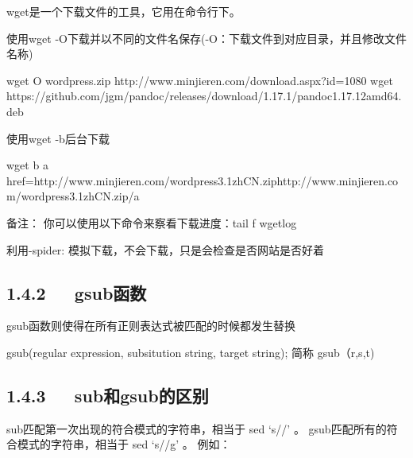\documentclass[letterpaper,12pt,english]{sphinxmanual}
\begin{document}
wget是一个下载文件的工具，它用在命令行下。

使用wget -O下载并以不同的文件名保存(-O：下载文件到对应目录，并且修改文件名称)

\begin{sphinxVerbatim}[commandchars=\\\{\}]
wget \PYGZhy{}O wordpress.zip http://www.minjieren.com/download.aspx?id=1080
wget https://github.com/jgm/pandoc/releases/download/1.17.1/pandoc\PYGZhy{}1.17.1\PYGZhy{}2\PYGZhy{}amd64.deb
\end{sphinxVerbatim}

使用wget -b后台下载

\begin{sphinxVerbatim}[commandchars=\\\{\}]
wget \PYGZhy{}b \PYGZlt{}a href=\PYGZdq{}http://www.minjieren.com/wordpress\PYGZhy{}3.1\PYGZhy{}zh\PYGZus{}CN.zip\PYGZdq{}\PYGZgt{}http://www.minjieren.com/wordpress\PYGZhy{}3.1\PYGZhy{}zh\PYGZus{}CN.zip\PYGZlt{}/a\PYGZgt{}

备注： 你可以使用以下命令来察看下载进度：tail \PYGZhy{}f wget\PYGZhy{}log
\end{sphinxVerbatim}

利用-spider: 模拟下载，不会下载，只是会检查是否网站是否好着

\begin{sphinxVerbatim}[commandchars=\\\{\}]
    
\end{sphinxVerbatim}


\subsection{1.4.2   gsub函数}
\label{\detokenize{001software/001install/linux:gsub}}
gsub函数则使得在所有正则表达式被匹配的时候都发生替换

\begin{sphinxVerbatim}[commandchars=\\\{\}]
gsub(regular expression, subsitution string, target string);
简称 gsub（r,s,t)
\end{sphinxVerbatim}


\subsection{1.4.3   sub和gsub的区别}
\label{\detokenize{001software/001install/linux:subgsub}}
sub匹配第一次出现的符合模式的字符串，相当于 sed ‘s//’ 。
gsub匹配所有的符合模式的字符串，相当于 sed ‘s//g’ 。
例如：
\end{document}
